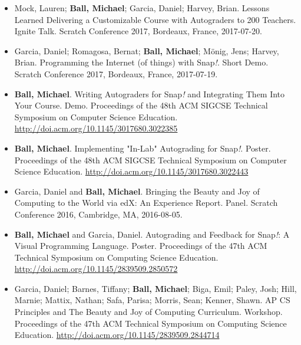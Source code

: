 \begin{itemize}
    \item{Mock, Lauren; \textbf{Ball, Michael}; Garcia, Daniel; Harvey, Brian. Lessons Learned Delivering a Customizable Course with Autograders to 200 Teachers. Ignite Talk. Scratch Conference 2017, Bordeaux, France, 2017-07-20.}
    
    \item{Garcia, Daniel; Romagosa, Bernat; \textbf{Ball, Michael}; Mönig, Jens; Harvey, Brian. Programming the Internet (of things) with Snap\textit{!}. Short Demo. Scratch Conference 2017, Bordeaux, France, 2017-07-19.}

    \item{\textbf{Ball, Michael}. Writing Autograders for Snap\textit{!} and Integrating Them Into Your Course. Demo. Proceedings of the 48th ACM SIGCSE Technical Symposium on Computer Science Education.} \href{http://doi.acm.org/10.1145/3017680.3022385}{http://doi.acm.org/10.1145/3017680.3022385}

    \item{\textbf{Ball, Michael}. Implementing "In-Lab" Autograding for Snap\textit{!}. Poster. Proceedings of the 48th ACM SIGCSE Technical Symposium on Computer Science Education.} \newline\href{http://doi.acm.org/10.1145/3017680.3022443}{http://doi.acm.org/10.1145/3017680.3022443}
    

    \item{Garcia, Daniel and \textbf{Ball, Michael}. Bringing the Beauty and Joy of Computing to the World via edX: An Experience Report. Panel. Scratch Conference 2016, Cambridge, MA, 2016-08-05.}

    \item{\textbf{Ball, Michael} and Garcia, Daniel. Autograding and Feedback for Snap\textit{!}: A Visual Programming Language. Poster. Proceedings of the 47th ACM Technical Symposium on Computing Science Education.}
    \href{http://doi.acm.org/10.1145/2839509.2850572}{http://doi.acm.org/10.1145/2839509.2850572}

    \item{Garcia, Daniel; Barnes, Tiffany; \textbf{Ball, Michael}; Biga, Emil; Paley, Josh; Hill, Marnie; Mattix, Nathan; Safa, Parisa; Morris, Sean; Kenner, Shawn. AP CS Principles and The Beauty and Joy of Computing Curriculum. Workshop. Proceedings of the 47th ACM Technical Symposium on Computing Science Education.} \href{http://doi.acm.org/10.1145/2839509.2844714}{http://doi.acm.org/10.1145/2839509.2844714}


\end{itemize}
